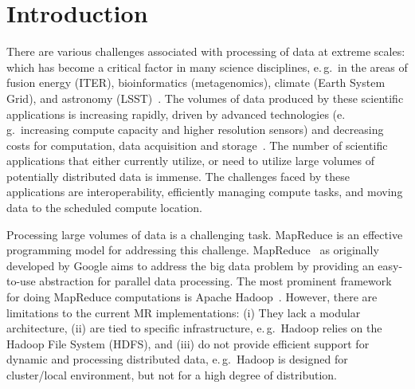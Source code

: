 \documentclass{acm_proc_article-sp}
\newcommand{\upp}{\vspace*{-0.5em}}
\begin{document}



\upp
\section{Introduction}


There are various challenges associated with processing of data at
extreme scales: which has become a critical factor in many science
disciplines, e.\,g.\ in the areas of fusion energy (ITER),
bioinformatics (metagenomics), climate (Earth System Grid), and
astronomy
(LSST)~\cite{Berriman:2011:AAS:2039359.2047483,Jha:2011fk}. The
volumes of data produced by these scientific applications is
increasing rapidly, driven by advanced technologies (e.\,g.\
increasing compute capacity and higher resolution sensors) and
decreasing costs for computation, data acquisition and
storage~\cite{hey2009}. The number of scientific applications that
either currently utilize, or need to utilize large volumes of
potentially distributed data is immense. The challenges faced by these
applications are interoperability, efficiently managing compute tasks,
and moving data to the scheduled compute location.


Processing large volumes of data is a challenging task. MapReduce is
an effective programming model for addressing this challenge.
MapReduce~\cite{Dean:2004:MSD:1251254.1251264} as originally developed
by Google aims to address the big data problem by providing an
easy-to-use abstraction for parallel data processing. The most
prominent framework for doing MapReduce computations is Apache
Hadoop~\cite{hadoop}. However, there are limitations to the current MR
implementations: (i) They lack a modular architecture, (ii) are
tied to specific infrastructure, e.\,g.\ Hadoop relies on the Hadoop
File System (HDFS), and (iii) do not provide efficient support for
dynamic and processing distributed data, e.\,g.\ Hadoop is designed
for cluster/local environment, but not for a high degree of
distribution.
\end{document}
